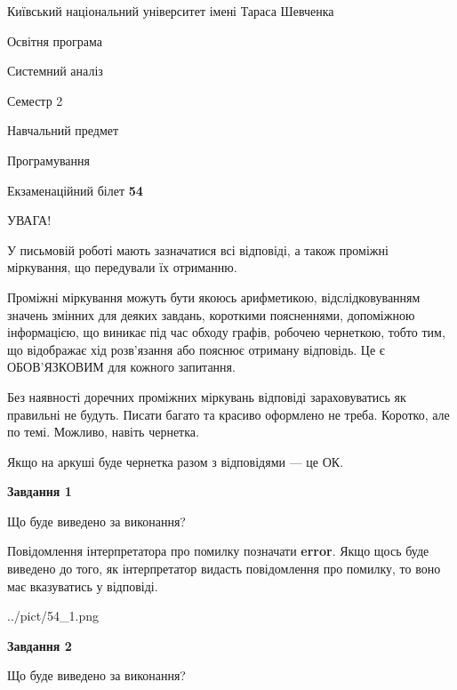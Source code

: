 \documentclass[12pt, ukrainian]{article}
\begin{document}
{{\begin {small}\par
{ \center  Київський національний університет імені Тараса Шевченка \par}
{\parbox {5 cm}{Освітня програма \hfill}{\parbox {7 cm}{Системний аналіз \hfill}}\parbox {6 cm}{\hfill Семестр 2}}\par
{\parbox {5 cm} {Навчальний предмет \hfill}\parbox {7 cm}{Програмування \hfill}\parbox {6cm}{\hfill}\par}\vspace{-7pt} \end{small}}{\center Екзаменаційний білет \No \textbf
{ 54 }\par}}
{
\begin {large}
УВАГА!

У письмовій роботі мають зазначатися всі відповіді, а також проміжні міркування, що передували їх отриманню.

Проміжні міркування можуть бути якоюсь арифметикою, відслідковуванням зна\-чень змінних для деяких завдань,
короткими поясненнями, допоміжною інформацією, що виникає під час обходу графів, робочею чернеткою,
тобто тим, що відображає хід розв’язання або пояснює отриману відповідь.
Це є ОБОВ’ЯЗКОВИМ для кожного запитання.

Без наявності доречних проміжних міркувань відповіді зараховуватись як правиль\-ні не будуть.
Писати багато та красиво оформлено не треба. Коротко, але по темі. Можли\-во, навіть чернетка.

Якщо на аркуші буде чернетка разом з відповідями --- це ОК.

\newpage

{\begin {center}\textbf{Завдання 1}\end {center}}\par
Що буде виведено за виконання?

Повідомлення інтерпретатора про помилку позначати \textbf{error}.
Якщо щось буде виведено до того, як інтерпретатор видасть повідомлення про помилку, 
то воно має вказуватись у відповіді. \par


\begin{center}
	{../pict/54_1.png}
\end{center}
\newpage

{\begin {center}\textbf{Завдання 2}\end {center}}\par
Що буде виведено за виконання?


\end{large}}
\end{document}
